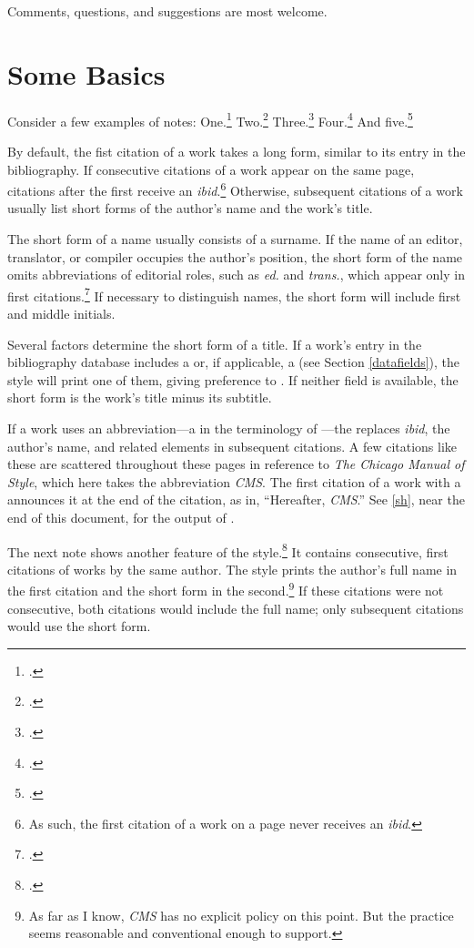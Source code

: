\documentclass[11pt,letterpaper,oneside]{article}
\begin{document}
Comments, questions, and suggestions are most welcome.

\section{Some Basics}
\label{basics}

Consider a few examples of notes: One.\footcite{beattie1974}
Two.\footcite[51]{beattie1974} Three.\footcite[51]{beattie1974}
Four.\footcite[35]{shields2008} And five.\footcite[51]{beattie1974}

By default, the fist citation of a work takes a long form, similar to
its entry in the bibliography. If consecutive citations of a work
appear on the same page, citations after the first receive an
\textit{ibid}.\footnote{As such, the first citation of a work on a
page never receives an \textit{ibid}.} Otherwise, subsequent citations
of a work usually list short forms of the author's name and the work's
title.

The short form of a name usually consists of a surname. If the name of
an editor, translator, or compiler occupies the author's position, the
short form of the name omits abbreviations of editorial roles, such as
\textit{ed.} and \textit{trans.}, which appear only in first
citations.\footcite[See \S14.18, \S14.27, \S14.76]{chicago2010} If
necessary to distinguish names, the short form will include first and
middle initials.

Several factors determine the short form of a title. If a work's entry
in the bibliography database includes a  or, if
applicable, a  (see Section
\ref{datafields}), the style will print one of them, giving preference
to . If neither field is available, the short
form is the work's title minus its subtitle.

If a work uses an abbreviation---a  in the
terminology of \biblatex---the  replaces
\textit{ibid}, the author's name, and related elements in subsequent
citations. A few citations like these are scattered throughout these
pages in reference to \textit{The Chicago Manual of Style}, which here
takes the abbreviation \textit{CMS}. The first citation of a work with
a  announces it at the end of the citation, as in,
``Hereafter, \textit{CMS}.'' See \ref{sh}, near the end of this
document, for the output of .

The next note shows another feature of the
style.\footcite{camus1991a,camus1991b} It contains consecutive, first
citations of works by the same author. The style prints the author's
full name in the first citation and the short form in the
second.\footnote{As far as I know, \textit{CMS} has no explicit policy
on this point. But the practice seems reasonable and conventional
enough to support.} If these citations were not consecutive, both
citations would include the full name; only subsequent citations would
use the short form.
\end{document}
